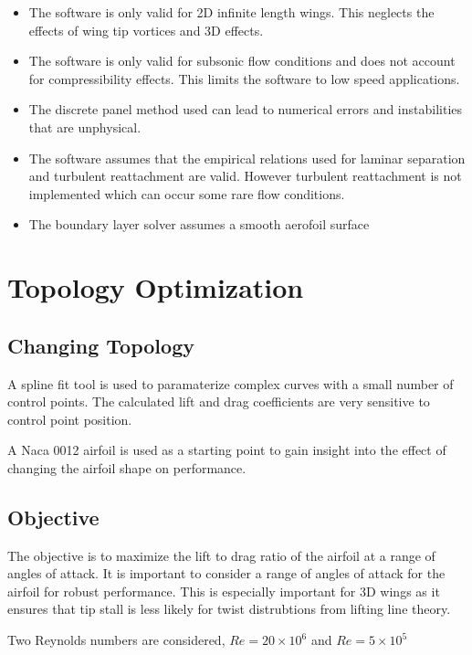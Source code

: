 \documentclass{article}
\begin{document}
\begin{itemize}
    \item The software is only valid for 2D infinite length wings. This neglects the effects of wing tip vortices and 3D effects.
    \item The software is only valid for subsonic flow conditions and does not account for compressibility effects. This limits the software to low speed applications.
    \item The discrete panel method used can lead to numerical errors and instabilities that are unphysical.
    \item The software assumes that the empirical relations used for laminar separation and turbulent reattachment are valid. However turbulent reattachment is not implemented which can occur some rare flow conditions.
    \item The boundary layer solver assumes a smooth aerofoil surface 
\end{itemize}

\section{Topology Optimization}

\subsection{Changing Topology}

A spline fit tool is used to paramaterize complex curves with a small number of control points.
The calculated lift and drag coefficients are very sensitive to control point position.

A Naca 0012 airfoil is used as a starting point to gain insight into the effect of changing the airfoil shape on performance.

\subsection{Objective}

The objective is to maximize the lift to drag ratio of the airfoil at a range of angles of attack.
It is important to consider a range of angles of attack for the airfoil for robust performance.
This is especially important for 3D wings as it ensures that tip stall is less likely for twist distrubtions from lifting line theory.

Two Reynolds numbers are considered, $Re = 20\times10^6$ and $Re = 5\times10^5$
\end{document}
